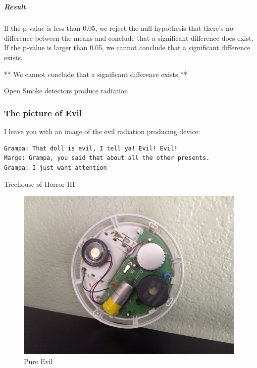 \documentclass[11pt]{article}
\makeatletter
\def\maxwidth{\ifdim\Gin@nat@width>\linewidth\linewidth
    \else\Gin@nat@width\fi}
\let\Oldincludegraphics\includegraphics
\renewcommand{\includegraphics}[1]{\Oldincludegraphics[width=.8\maxwidth]{#1}}
\makeatother
\begin{document}
    \begin{center}
    \end{center}
    { \hspace*{\fill} \\}
    
    \subparagraph{Result}\label{result}

If the p-value is less than 0.05, we reject the null hypothesis that
there's no difference between the means and conclude that a significant
difference does exist. If the p-value is larger than 0.05, we cannot
conclude that a significant difference exists.

** We cannot conclude that a significant difference exists **

Open Smoke detectors produce radiation

    \subsubsection{The picture of Evil}\label{the-picture-of-evil}

I leave you with an image of the evil radiation producing device:

\begin{verbatim}
Grampa: That doll is evil, I tell ya! Evil! Evil!    
Marge: Grampa, you said that about all the other presents.    
Grampa: I just want attention    
\end{verbatim}

Treehouse of Horror III

\begin{figure}
\centering
\includegraphics{./sd.jpg}
\caption{Pure Evil}
\end{figure}


    
    
    
    
\end{document}
